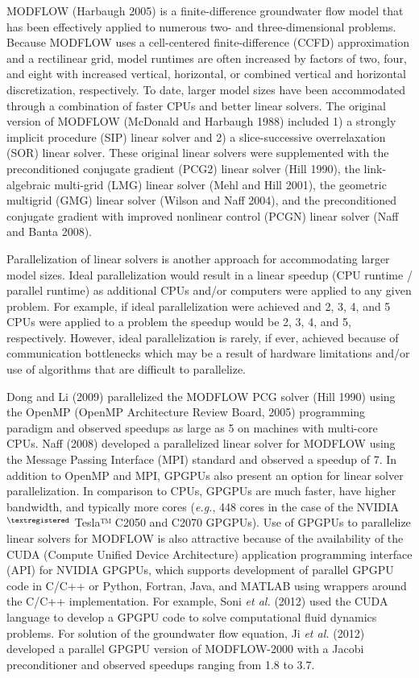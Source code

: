 \documentclass[12pt]{article}
\begin{document}
MODFLOW (Harbaugh 2005) is a finite-difference groundwater flow model that has been effectively applied to \color{blue}numerous \color{black}two- and three-dimensional problems. Because MODFLOW uses a cell-centered finite-difference (CCFD) approximation and a rectilinear grid, model runtimes are often increased by factors of two, four, and eight with increased vertical, horizontal, or combined vertical and horizontal discretization, respectively. To date, larger model sizes have been accommodated through a combination of faster CPUs and better linear solvers. The original version of MODFLOW (McDonald and Harbaugh 1988) included 1) a strongly implicit procedure (SIP) linear solver and 2) a slice-successive overrelaxation (SOR) linear solver. These original linear solvers were supplemented with the preconditioned conjugate gradient (PCG2) linear solver (Hill 1990), the link-algebraic multi-grid (LMG) linear solver (Mehl and Hill 2001), the geometric multigrid (GMG) linear solver (Wilson and Naff 2004), and the  preconditioned conjugate gradient with improved nonlinear control (PCGN) linear solver (Naff and Banta 2008).

Parallelization of linear solvers is another approach for accommodating larger model sizes. \color{blue}Ideal parallelization would result in a linear speedup  (CPU runtime / parallel runtime) as additional CPUs and/or computers were applied to any given problem. For example, if ideal parallelization were achieved and 2, 3, 4, and 5 CPUs were applied to a problem the speedup would be 2, 3, 4, and 5, respectively. However, ideal parallelization is rarely, if ever, achieved because of communication bottlenecks which may be a result of hardware limitations and/or use of algorithms that are difficult to parallelize.

\color{black}Dong and Li (2009) parallelized the MODFLOW PCG solver (Hill 1990) using the OpenMP (OpenMP Architecture Review Board, 2005) programming paradigm and observed speedups as large as 5 on machines with multi-core CPUs. Naff (2008) developed a parallelized linear solver for MODFLOW using the Message Passing Interface (MPI) standard and observed a speedup of 7. In addition to OpenMP and MPI, GPGPUs also \color{blue}present \color{black}an option for linear solver parallelization. In comparison to CPUs, GPGPUs are much faster, have higher bandwidth, and typically more cores (\textit{e.g.}, 448 \color{blue} cores \color{black} in the case of the NVIDIA$^{\textregistered}$ Tesla™ C2050 and C2070 GPGPUs). Use of GPGPUs to parallelize linear solvers for MODFLOW is also attractive because of the availability of the CUDA (Compute Unified Device Architecture) application programming interface (API) for NVIDIA GPGPUs, which supports development of parallel GPGPU code in C/C++ or Python, Fortran, Java, and MATLAB using wrappers around the C/C++ implementation. For example, Soni \textit{et al.} (2012) used the CUDA language to develop a GPGPU code to solve computational fluid dynamics problems. For solution of the groundwater flow equation, Ji \textit{et al.} (2012) developed a parallel GPGPU version of MODFLOW-2000 with a Jacobi preconditioner and observed speedups ranging from 1.8 to 3.7.
\end{document}
